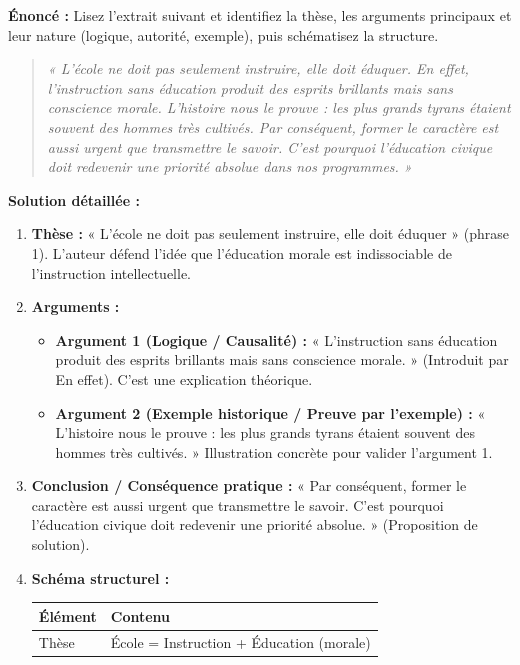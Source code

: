 \documentclass[11pt]{article}
\newcommand{\cle}[1]{{\popxbold\color{popdark}#1}}
\begin{document}
\begin{exoresolu}
    \textbf{Énoncé :} Lisez l'extrait suivant et identifiez la thèse, les arguments principaux et leur nature (logique, autorité, exemple), puis schématisez la structure.
    \begin{quote}
        \textit{« L'école ne doit pas seulement instruire, elle doit éduquer. En effet, l'instruction sans éducation produit des esprits brillants mais sans conscience morale. L'histoire nous le prouve : les plus grands tyrans étaient souvent des hommes très cultivés. Par conséquent, former le caractère est aussi urgent que transmettre le savoir. C'est pourquoi l'éducation civique doit redevenir une priorité absolue dans nos programmes. »}
    \end{quote}
    \tcblower
    \textbf{Solution détaillée :}
    \begin{enumerate}
        \item \textbf{Thèse :} « L'école ne doit pas seulement instruire, elle doit éduquer » (phrase 1). L'auteur défend l'idée que l'éducation morale est indissociable de l'instruction intellectuelle.
        \item \textbf{Arguments :}
            \begin{itemize}
                \item \textbf{Argument 1 (Logique / Causalité) :} « L'instruction sans éducation produit des esprits brillants mais sans conscience morale. » (Introduit par \cle{En effet}). C'est une explication théorique.
                \item \textbf{Argument 2 (Exemple historique / Preuve par l'exemple) :} « L'histoire nous le prouve : les plus grands tyrans étaient souvent des hommes très cultivés. » Illustration concrète pour valider l'argument 1.
            \end{itemize}
        \item \textbf{Conclusion / Conséquence pratique :} « Par conséquent, former le caractère est aussi urgent que transmettre le savoir. C'est pourquoi l'éducation civique doit redevenir une priorité absolue. » (Proposition de solution).
        \item \textbf{Schéma structurel :}
        \begin{center}
            \begin{tabular}{|l|p{10cm}|}\hline
            \textbf{Élément} & \textbf{Contenu} \\ \hline
            Thèse & École = Instruction + Éducation (morale) \\ \hline

\end{tabular}
\end{center}
\end{enumerate}
\end{exoresolu}
\end{document}
